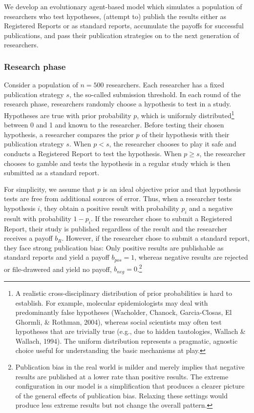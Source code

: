 \documentclass[
  british,
  a4paper,
  ,man,mask,floatsintext]{apa6}
\begin{document}
We develop an evolutionary agent-based model which simulates a population of researchers who test hypotheses, (attempt to) publish the results either as Registered Reports or as standard reports, accumulate the payoffs for successful publications, and pass their publication strategies on to the next generation of researchers.

\subsubsection{Research phase}\label{research-phase}

Consider a population of \(n = 500\) researchers.
Each researcher has a fixed publication strategy \(s\), the so-called submission threshold.
In each round of the research phase, researchers randomly choose a hypothesis to test in a study.
Hypotheses are true with prior probability \(p\), which is uniformly distributed\footnote{A realistic cross-disciplinary distribution of prior probabilities is hard to establish. For example, molecular epidemiologists may deal with predominantly false hypotheses (Wacholder, Chanock, Garcia-Closas, El Ghormli, \& Rothman, 2004), whereas social scientists may often test hypotheses that are trivially true (e.g., due to hidden tautologies, Wallach \& Wallach, 1994). The uniform distribution represents a pragmatic, agnostic choice useful for understanding the basic mechanisms at play.} between 0 and 1 and known to the researcher.
Before testing their chosen hypothesis, a researcher compares the prior \(p\) of their hypothesis with their publication strategy \(s\).
When \(p < s\), the researcher chooses to play it safe and conducts a Registered Report to test the hypothesis.
When \(p \geq s\), the researcher chooses to gamble and tests the hypothesis in a regular study which is then submitted as a standard report.

For simplicity, we assume that \(p\) is an ideal objective prior and that hypothesis tests are free from additional sources of error.
Thus, when a researcher tests hypothesis \(i\), they obtain a positive result with probability \(p_i\) and a negative result with probability \(1-p_i\).
If the researcher chose to submit a Registered Report, their study is published regardless of the result and the researcher receives a payoff \(b_{R}\).
However, if the researcher chose to submit a standard report, they face strong publication bias:
Only positive results are publishable as standard reports and yield a payoff \(b_{pos} = 1\), whereas negative results are rejected or file-drawered and yield no payoff, \(b_{neg} = 0\).\footnote{Publication bias in the real world is milder and merely implies that negative results are published at a lower rate than positive results. The extreme configuration in our model is a simplification that produces a clearer picture of the general effects of publication bias. Relaxing these settings would produce less extreme results but not change the overall pattern.}
\end{document}
